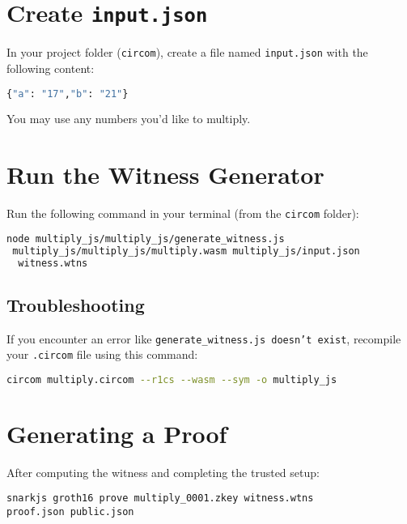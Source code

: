 \documentclass{article}
\begin{document}
	\section*{Create \texttt{input.json}}
	
	In your project folder (\texttt{circom}), create a file named \texttt{input.json} with the following content:
	
	\begin{lstlisting}[language=bash,caption={input.json},basicstyle=\ttfamily\small]
{"a": "17","b": "21"}
	\end{lstlisting}
	
	You may use any numbers you'd like to multiply.
	
	\section*{Run the Witness Generator}
	
	Run the following command in your terminal (from the \texttt{circom} folder):
	
	\begin{lstlisting}[language=bash,basicstyle=\ttfamily\small]
node multiply_js/multiply_js/generate_witness.js
 multiply_js/multiply_js/multiply.wasm multiply_js/input.json
  witness.wtns

	\end{lstlisting}
	
	\subsection*{Troubleshooting}
	
	If you encounter an error like \texttt{generate\_witness.js doesn't exist}, recompile your \texttt{.circom} file using this command:
	
	\begin{lstlisting}[language=bash,basicstyle=\ttfamily\small]
circom multiply.circom --r1cs --wasm --sym -o multiply_js
	\end{lstlisting}
	\section*{Generating a Proof}
	
	After computing the witness and completing the trusted setup:
	
	\begin{tcolorbox}[title=Generate Proof]
		\begin{lstlisting}
snarkjs groth16 prove multiply_0001.zkey witness.wtns 
proof.json public.json
		\end{lstlisting}
	\end{tcolorbox}
	
\end{document}
